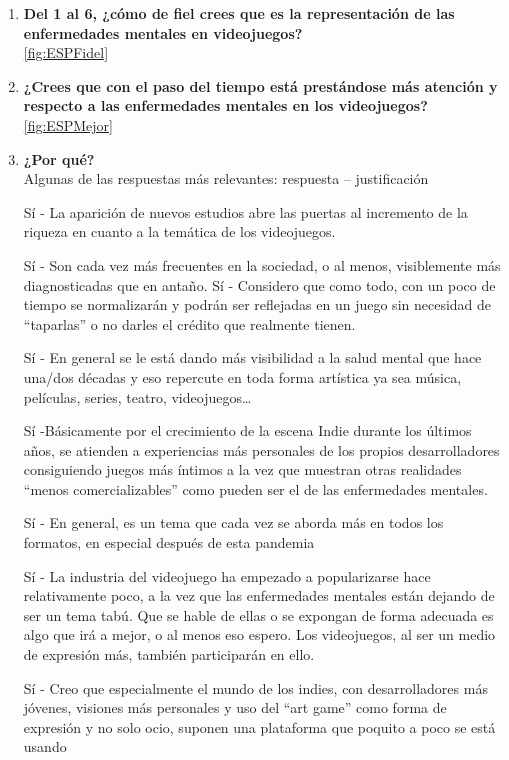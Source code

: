 \documentclass[12pt, a4paper,twoside,titlepage]{book}
\begin{document}
\begin{enumerate}[label=\textbf{\arabic*}.]
    
     \item \textbf{Del 1 al 6, ¿cómo de fiel crees que es la representación de las enfermedades mentales en videojuegos?}\\
     \ref{fig:ESPFidel}
     \item \textbf{¿Crees que con el paso del tiempo está prestándose más atención y respecto a las enfermedades mentales en los videojuegos?}\\
     \ref{fig:ESPMejor}
     \item \textbf{¿Por qué? }\\
    \label{mejorCastellano}
    Algunas de las respuestas más relevantes: respuesta – justificación
        
        Sí - La aparición de nuevos estudios abre las puertas al incremento de la riqueza en cuanto a la temática de los videojuegos.
        
        Sí - Son cada vez más frecuentes en la sociedad, o al menos, visiblemente más diagnosticadas que en antaño.
        Sí - Considero que como todo, con un poco de tiempo se normalizarán y podrán ser reflejadas en un juego sin necesidad de ``taparlas'' o no darles el crédito que realmente tienen.
        
        Sí - En general se le está dando más visibilidad a la salud mental que hace una/dos décadas y eso repercute en toda forma artística ya sea música, películas, series, teatro, videojuegos…
        
        Sí -Básicamente por el crecimiento de la escena Indie durante los últimos años, se atienden a experiencias más personales de los propios desarrolladores consiguiendo juegos más íntimos a la vez que muestran otras realidades ``menos comercializables'' como pueden ser el de las enfermedades mentales.
        
        Sí - En general, es un tema que cada vez se aborda más en todos los formatos, en especial después de esta pandemia
        
        Sí - La industria del videojuego ha empezado a popularizarse hace relativamente poco, a la vez que las enfermedades mentales están dejando de ser un tema tabú. Que se hable de ellas o se expongan de forma adecuada es algo que irá a mejor, o al menos eso espero. Los videojuegos, al ser un medio de expresión más, también participarán en ello.
        
        Sí -	Creo que especialmente el mundo de los indies, con desarrolladores más jóvenes, visiones más personales y uso del ``art game'' como forma de expresión y no solo ocio, suponen una plataforma que poquito a poco se está usando
        

\end{enumerate}
\end{document}
